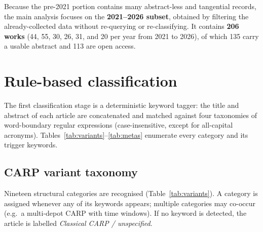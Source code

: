 \documentclass[11pt]{article}
\begin{document}
Because the pre-2021 portion contains many abstract-less and tangential records, the
main analysis focuses on the \textbf{2021--2026 subset}, obtained by filtering the
already-collected data without re-querying or re-classifying. It contains
\textbf{206 works} (44, 55, 30, 26, 31, and 20 per year from 2021 to 2026), of which
135 carry a usable abstract and 113 are open access.

\section{Rule-based classification}

The first classification stage is a deterministic keyword tagger: the title and
abstract of each article are concatenated and matched against four taxonomies of
word-boundary regular expressions (case-insensitive, except for all-capital
acronyms). Tables~\ref{tab:variants}--\ref{tab:metas} enumerate every category and
its trigger keywords.

\subsection{CARP variant taxonomy}

Nineteen structural categories are recognised (Table~\ref{tab:variants}). A category
is assigned whenever any of its keywords appears; multiple categories may co-occur
(e.g.\ a multi-depot CARP with time windows). If no keyword is detected, the article
is labelled \emph{Classical CARP / unspecified}.
\end{document}

